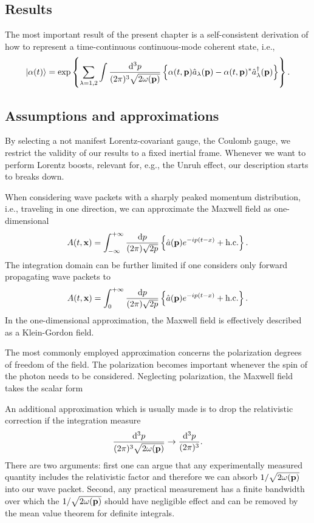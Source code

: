 
\subsection*{Results}

The most important result of the present chapter is a self-consistent derivation of how to represent a time-continuous continuous-mode coherent state, i.e.,
\begin{equation}
	\ket{\alpha(t)}
	=
	\exp\left\{
		\sum_{\lambda=1,2}
		\int\frac{\dd[3]{p}}{(2\pi)^3\sqrt{2\omega(\vb{p})}}
		\left\{
			\alpha(t,\vb{p})
			\hat{a}_\lambda(\vb{p})
			-
			\alpha(t,\vb{p})^*
			\hat{a}_\lambda^\dagger(\vb{p})
		\right\}
	\right\}
	.
\end{equation}

\subsection*{Assumptions and approximations}

By selecting a not manifest Lorentz-covariant gauge, the Coulomb gauge, we restrict the validity of our results to a fixed inertial frame.
Whenever we want to perform Lorentz boosts, relevant for, e.g., the Unruh effect, our description starts to breaks down.

When considering wave packets with a sharply peaked momentum distribution, i.e., traveling in one direction, we can approximate the Maxwell field as one-dimensional
\begin{equation}
	A(t,\vb{x})
	=
	\int_{-\infty}^{+\infty}
	\frac{\dd{p}}{(2\pi)\sqrt{2p}}
	\left\{
		\hat{a}(\vb{p})
		e^{-ip(t-x)}
		+
		\text{h.c.}
	\right\}
	.
\end{equation}
The integration domain can be further limited if one considers only forward propagating wave packets to
\begin{equation}
	A(t,\vb{x})
	=
	\int_0^{+\infty}
	\frac{\dd{p}}{(2\pi)\sqrt{2p}}
	\left\{
		\hat{a}(\vb{p})
		e^{-ip(t-x)}
		+
		\text{h.c.}
	\right\}
	.
\end{equation}
In the one-dimensional approximation, the Maxwell field is effectively described as a Klein-Gordon field.

The most commonly employed approximation concerns the polarization degrees of freedom of the field.
The polarization becomes important whenever the spin of the photon needs to be considered.
Neglecting polarization, the Maxwell field takes the scalar form

An additional approximation which is usually made is to drop the relativistic correction if the integration measure
\begin{equation*}
	\frac{\dd[3]{p}}{(2\pi)^3\sqrt{2\omega(\vb{p})}}
	\to
	\frac{\dd[3]{p}}{(2\pi)^3}
	.
\end{equation*}
There are two arguments: first one can argue that any experimentally measured quantity includes the relativistic factor and therefore we can absorb $1/\sqrt{2\omega(\vb{p})}$ into our wave packet.
Second, any practical measurement has a finite bandwidth over which the $1/\sqrt{2\omega(\vb{p})}$ should have negligible effect and can be removed by the mean value theorem for definite integrals.